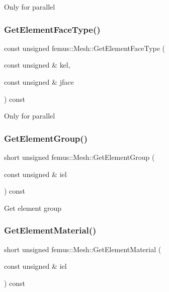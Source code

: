Only for parallel \mbox{\label{classfemus_1_1_mesh_a57f92951660269429cc7f04ee3c26c17}} 
\subsubsection{\texorpdfstring{Get\+Element\+Face\+Type()}{GetElementFaceType()}}
{\footnotesize\ttfamily const unsigned femus\+::\+Mesh\+::\+Get\+Element\+Face\+Type (\begin{DoxyParamCaption}\item[{const unsigned \&}]{kel,  }\item[{const unsigned \&}]{jface }\end{DoxyParamCaption}) const}

Only for parallel \mbox{\label{classfemus_1_1_mesh_a7048c3c810f26183680f9f086baf27ae}} 
\subsubsection{\texorpdfstring{Get\+Element\+Group()}{GetElementGroup()}}
{\footnotesize\ttfamily short unsigned femus\+::\+Mesh\+::\+Get\+Element\+Group (\begin{DoxyParamCaption}\item[{const unsigned \&}]{iel }\end{DoxyParamCaption}) const}

Get element group \mbox{\label{classfemus_1_1_mesh_ad0dcbe941f581f15423a3d5be2ad7cd4}} 
\subsubsection{\texorpdfstring{Get\+Element\+Material()}{GetElementMaterial()}}
{\footnotesize\ttfamily short unsigned femus\+::\+Mesh\+::\+Get\+Element\+Material (\begin{DoxyParamCaption}\item[{const unsigned \&}]{iel }\end{DoxyParamCaption}) const}

